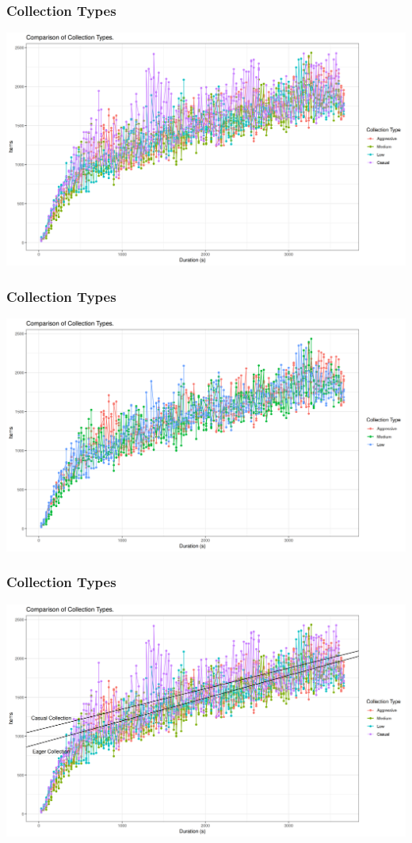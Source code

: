 \documentclass{beamer}
\begin{document}
    \begin{frame}
        \frametitle{Collection Types}
        \includegraphics[width=\textwidth]{CollectionType1_1}
    \end{frame}
    \begin{frame}
        \frametitle{Collection Types}
        \includegraphics[width=\textwidth]{CollectionType2_1}
    \end{frame}

    \begin{frame}
        \frametitle{Collection Types}
        \includegraphics[width=\textwidth]{CollectionType3_1}
    \end{frame}
\end{document}
